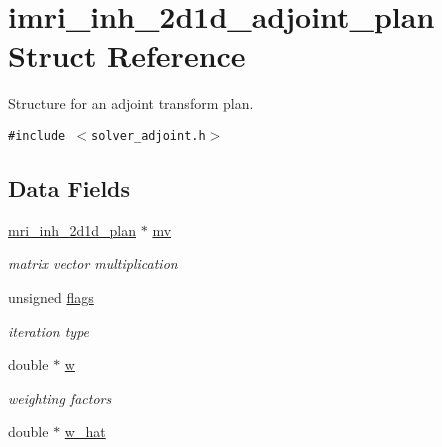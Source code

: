 \hypertarget{structimri__inh__2d1d__adjoint__plan}{
\section{imri\_\-inh\_\-2d1d\_\-adjoint\_\-plan Struct Reference}
\label{structimri__inh__2d1d__adjoint__plan}
}
Structure for an adjoint transform plan.  


{\tt \#include $<$solver\_\-adjoint.h$>$}

\subsection*{Data Fields}
\begin{CompactItemize}
\item 
\hypertarget{structimri__inh__2d1d__adjoint__plan_o0}{
\hyperlink{structmri__inh__2d1d__plan}{mri\_\-inh\_\-2d1d\_\-plan} $\ast$ \hyperlink{structimri__inh__2d1d__adjoint__plan_o0}{mv}}
\label{structimri__inh__2d1d__adjoint__plan_o0}

\begin{CompactList}\small\item\em matrix vector multiplication \item\end{CompactList}\item 
\hypertarget{structimri__inh__2d1d__adjoint__plan_o1}{
unsigned \hyperlink{structimri__inh__2d1d__adjoint__plan_o1}{flags}}
\label{structimri__inh__2d1d__adjoint__plan_o1}

\begin{CompactList}\small\item\em iteration type \item\end{CompactList}\item 
\hypertarget{structimri__inh__2d1d__adjoint__plan_o2}{
double $\ast$ \hyperlink{structimri__inh__2d1d__adjoint__plan_o2}{w}}
\label{structimri__inh__2d1d__adjoint__plan_o2}

\begin{CompactList}\small\item\em weighting factors \item\end{CompactList}\item 
\hypertarget{structimri__inh__2d1d__adjoint__plan_o3}{
double $\ast$ \hyperlink{structimri__inh__2d1d__adjoint__plan_o3}{w\_\-hat}}
\label{structimri__inh__2d1d__adjoint__plan_o3}


\end{CompactItemize}
